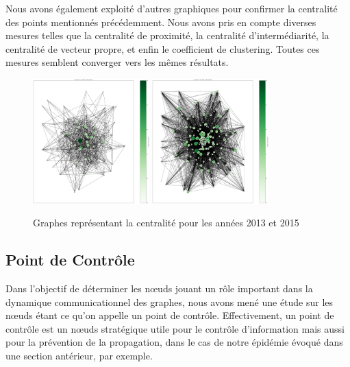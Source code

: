 \documentclass{article}
\begin{document}
Nous avons également exploité d'autres graphiques pour confirmer la centralité des points mentionnés précédemment. Nous avons pris en compte diverses mesures telles que la centralité de proximité, la centralité d'intermédiarité, la centralité de vecteur propre, et enfin le coefficient de clustering. Toutes ces mesures semblent converger vers les mêmes résultats.

\begin{figure}[!h]
    \centering
    \includegraphics[width=0.40\textwidth]{assets/centralite/between_centralite_2013.png}
    \hfill
    \includegraphics[width=0.40\textwidth]{assets/centralite/between_centralite_2015.png}
    \caption{Graphes représentant la centralité pour les années 2013 et 2015}
    \label{fig:deg_centralite_parallel}
\end{figure}

\subsection{Point de Contrôle}


Dans l’objectif de déterminer les nœuds jouant un rôle important dans la dynamique communicationnel des graphes, nous avons mené une étude sur les nœuds étant ce qu’on appelle un point de contrôle. Effectivement, un point de contrôle est un nœuds stratégique utile pour le contrôle d’information mais aussi pour la prévention de la propagation, dans le cas de notre épidémie évoqué dans une section antérieur, par exemple.
\end{document}
